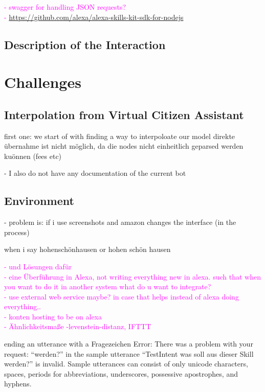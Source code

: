
\textcolor{magenta}{
- swagger for handling JSON requests?\\
- \url{https://github.com/alexa/alexa-skills-kit-sdk-for-nodejs}
}


\subsection*{Description of the Interaction}


\section{Challenges}


\subsection*{Interpolation from Virtual Citizen Assistant}
first one: we start of with finding a way to interpoloate our model
direkte übernahme ist nicht möglich, da die nodes nicht einheitlich geparsed werden kuönnen (fees etc)

- I also do not have any documentation of the current bot


\subsection*{Environment}
- problem is: if i use screenshots and amazon changes the interface (in the process)




when i say hohenschönhausen or hohen schön hausen


\textcolor{magenta}{
- und L\"osungen daf\"ur\\
- eine \"Uberf\"uhrung in Alexa, not writing everything new in alexa. such that when you want to do it in another system what do u want to integrate?\\
- use external web service maybe? in case that helps instead of alexa doing everything..\\
- konten hosting to be on alexa\\
- \"Ahnlichkeitsma{\ss}e -levenstein-distanz, IFTTT
}

ending an utterance with a Fragezeichen
Error: There was a problem with your request: ``werden?'' in the sample utterance ``TestIntent was soll aus dieser Skill werden?'' is invalid. Sample utterances can consist of only unicode characters, spaces, periods for abbreviations, underscores, possessive apostrophes, and hyphens.

